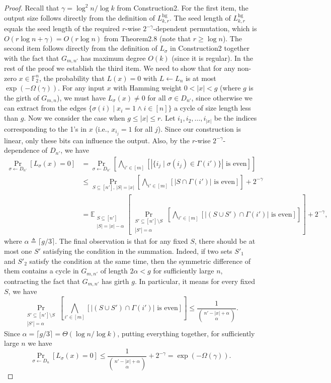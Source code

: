 \documentclass[10pt,a4paper]{article}
\begin{document}
\begin{proof}
Recall that $\gamma=\log^2n/\log k$ from Construction2. For the first item, the output size follows directly from the definition of $L^{\mathrm{hg}}_{k,r}$. The seed length of $L^{\mathrm{hg}}_{k,r}$ equals the seed length of the required $r$-wise $2^{-\gamma}$-dependent permutation, which is $O(r\log n+\gamma)=O(r\log n)$ from Theorem2.8 (note that $r\ge\log n$). The second item follows directly from the definition of $L_\sigma$ in Construction2 together with the fact that $G_{m,n'}$ has maximum degree $O(k)$ (since it is regular).
In the rest of the proof we establish the third item. We need to show that for any non-zero $x\in\mathbb F_2^n$, the probability that $L(x)=0$ with $L\leftarrow L_n$ is at most $\exp(-\Omega(\gamma))$. For any input $x$ with Hamming weight $0<|x|<g$ (where $g$ is the girth of $G_{m,n}$), we must have $L_\sigma(x)\ne0$ for all $\sigma\in D_{n'}$, since otherwise we can extract from the edges $\{\sigma(i)\mid x_i=1\wedge i\in[n]\}$ a cycle of size length less than $g$. Now we consider the case when $g\le|x|\le r$. Let $i_1,i_2,\ldots,i_{|x|}$ be the indices corresponding to the 1's in $x$ (i.e., $x_{i_j}=1$ for all $j$). Since our construction is linear, only these bits can influence the output. Also, by the $r$-wise $2^{-\gamma}$-dependence of $D_{n'}$, we have
\begin{align*}
\Pr_{\sigma\leftarrow D_{n'}}[L_\sigma(x)=0]
&=\Pr_{\sigma\leftarrow D_{n'}}\left[\bigwedge_{i'\in[m]}[|\{i_j\mid\sigma(i_j)\in\Gamma(i')\}|\text{ is even}]\right]\\
&\le\Pr_{S\subseteq[n'],\,|S|=|x|}\left[\bigwedge_{i'\in[m]}[|S\cap\Gamma(i')|\text{ is even}]\right]+2^{-\gamma}\\
&=\mathbb E_{\substack{S\subseteq[n']\\|S|=|x|-\alpha}}\left[\Pr_{\substack{S'\subseteq[n']\setminus S\\|S'|=\alpha}}\left[\bigwedge_{i'\in[m]}[|(S\cup S')\cap\Gamma(i')|\text{ is even}]\right]\right]+2^{-\gamma},
\end{align*}
where $\alpha\triangleq\lceil g/3\rceil$.
The final observation is that for any fixed $S$, there should be at most one $S'$ satisfying the condition in the summation. Indeed, if two sets $S'_1$ and $S'_2$ satisfy the condition at the same time, then the symmetric difference of them contains a cycle in $G_{m,n'}$ of length $2\alpha<g$ for sufficiently large $n$, contracting the fact that $G_{m,n'}$ has girth $g$. In particular, it means for every fixed $S$, we have
\[\Pr_{\substack{S'\subseteq[n']\setminus S\\|S'|=\alpha}}\left[\bigwedge_{i'\in[m]}[|(S\cup S')\cap\Gamma(i')|\text{ is even}]\right]\le\frac1{\binom{n'-|x|+\alpha}{\alpha}}.\]
Since $\alpha=\lceil g/3\rceil=\Theta(\log n/\log k)$, putting everything together, for sufficiently large $n$ we have
\[\Pr_{\sigma\leftarrow D_n}[L_\sigma(x)=0]\le\frac1{\binom{n'-|x|+\alpha}{\alpha}}+2^{-\gamma}=\exp(-\Omega(\gamma)).\]
\end{proof}
\end{document}
